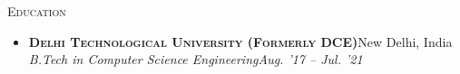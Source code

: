 

\textsc{Education}

\begin{itemize}[left=1.3em, labelsep=0.2em, labelwidth=2em, align=parleft]
\item
  \textsc{\textbf{Delhi Technological University (Formerly DCE)}}\hfill New Delhi, India\\
  \noindent \emph{B.Tech in Computer Science Engineering}\hfill \emph{Aug. '17 -- Jul. '21}
  \\
\end{itemize}
